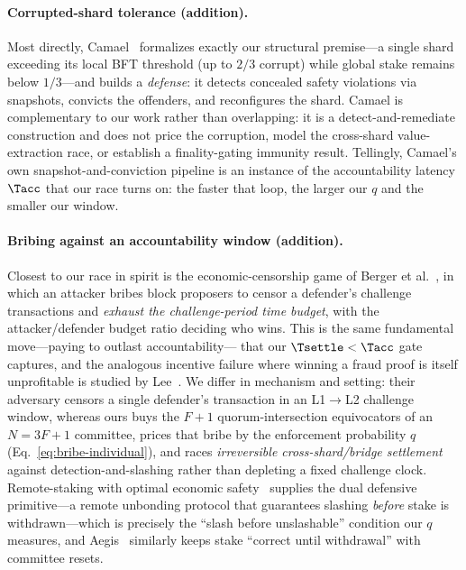 
\paragraph{Corrupted-shard tolerance (addition).}
Most directly, Camael~\cite{liu2025camael} formalizes exactly our structural premise---a single shard
exceeding its local BFT threshold (up to $2/3$ corrupt) while global stake remains below $1/3$---and
builds a \emph{defense}: it detects concealed safety violations via snapshots, convicts the offenders,
and reconfigures the shard. Camael is complementary to our work rather than overlapping: it is a
detect-and-remediate construction and does not price the corruption, model the cross-shard
value-extraction race, or establish a finality-gating immunity result. Tellingly, Camael's own
snapshot-and-conviction pipeline is an instance of the accountability latency $\Tacc$ that our race
turns on: the faster that loop, the larger our $q$ and the smaller our window.

\paragraph{Bribing against an accountability window (addition).}
Closest to our race in spirit is the economic-censorship game of Berger et
al.~\cite{berger2025censorship}, in which an attacker bribes block proposers to censor a defender's
challenge transactions and \emph{exhaust the challenge-period time budget}, with the attacker/defender
budget ratio deciding who wins. This is the same fundamental move---paying to outlast accountability---
that our $\Tsettle<\Tacc$ gate captures, and the analogous incentive failure where winning a fraud
proof is itself unprofitable is studied by Lee~\cite{lee2025hollow}. We differ in mechanism and setting:
their adversary censors a single defender's transaction in an L1$\rightarrow$L2 challenge window,
whereas ours buys the $F{+}1$ quorum-intersection equivocators of an $N{=}3F{+}1$ committee, prices that
bribe by the enforcement probability $q$ (Eq.~\eqref{eq:bribe-individual}), and races \emph{irreversible
cross-shard/bridge settlement} against detection-and-slashing rather than depleting a fixed challenge
clock. Remote-staking with optimal economic safety~\cite{dong2024remotestaking} supplies the dual
defensive primitive---a remote unbonding protocol that guarantees slashing \emph{before} stake is
withdrawn---which is precisely the ``slash before unslashable'' condition our $q$ measures, and
Aegis~\cite{baron2025aegis} similarly keeps stake ``correct until withdrawal'' with committee resets.

